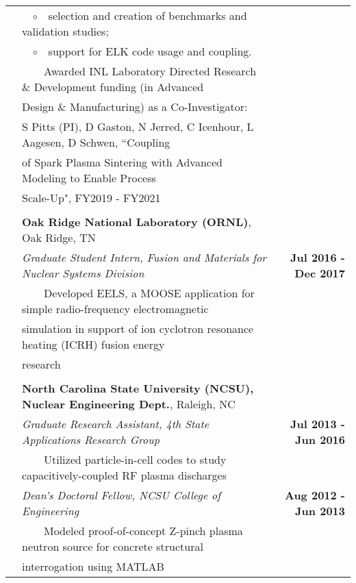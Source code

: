 \documentclass{article}
\newcommand{\tabitem}{~~\textbullet~~}
\newcommand{\tabitemii}{~~$\circ$~~}
\begin{document}
\begin{tabularx}{\textwidth}{l X r}
		& \hspace{1.5em} \tabitemii selection and creation of benchmarks and validation studies; & \\
		& \hspace{1.5em} \tabitemii support for ELK code usage and coupling. & \\
	& \tabitem Awarded INL Laboratory Directed Research \& Development funding (in Advanced & \\
	& \hspace{1.5em} Design \& Manufacturing) as a Co-Investigator: & \\
	& \hspace{2.5em} S Pitts (PI), D Gaston, N Jerred, C Icenhour, L Aagesen, D Schwen, ``Coupling & \\
	& \hspace{2.5em} of Spark Plasma Sintering with Advanced Modeling to Enable Process & \\
	& \hspace{2.5em} Scale-Up", FY2019 - FY2021 & \\
	& & \\
	& \textbf{Oak Ridge National Laboratory (ORNL)}, Oak Ridge, TN & \\
	& \textit{Graduate Student Intern, Fusion and Materials for Nuclear Systems Division} & \textbf{Jul 2016 - Dec 2017} \\
	& \tabitem Developed EELS, a MOOSE application for simple radio-frequency electromagnetic & \\
	& \hspace{1.5em} simulation in support of ion cyclotron resonance heating (ICRH) fusion energy & \\
	& \hspace{1.5em} research & \\
	& & \\
	& \textbf{North Carolina State University (NCSU), Nuclear Engineering Dept.}, Raleigh, NC & \\
	& \textit{Graduate Research Assistant, 4th State Applications Research Group} & \textbf{Jul 2013 - Jun 2016} \\
	& \tabitem Utilized particle-in-cell codes to study capacitively-coupled RF plasma discharges & \\
	& \textit{Dean's Doctoral Fellow, NCSU College of Engineering} & \textbf{Aug 2012 - Jun 2013} \\
	& \tabitem Modeled proof-of-concept Z-pinch plasma neutron source for concrete structural & \\
	& \hspace{1.5em} interrogation using MATLAB & \\
\end{tabularx}
\end{document}
